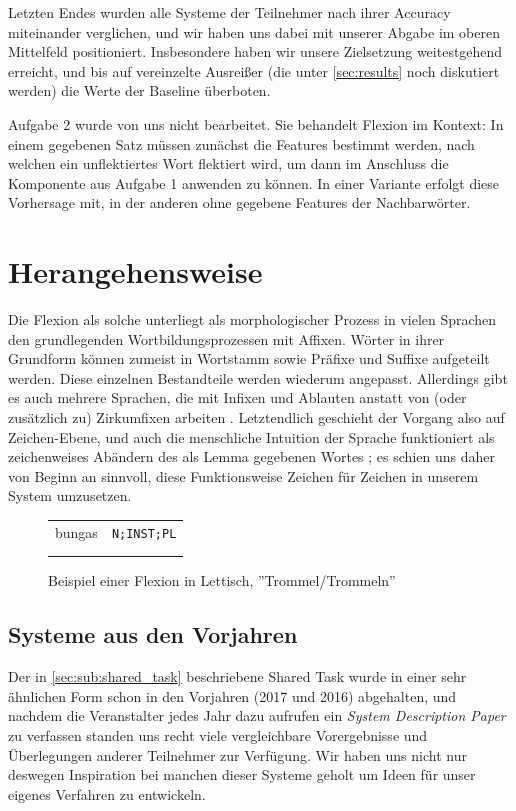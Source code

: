 \documentclass[11pt,a4paper]{article}
\begin{document}
Letzten Endes wurden alle Systeme der Teilnehmer nach ihrer Accuracy miteinander verglichen, und wir haben uns dabei mit unserer Abgabe im oberen Mittelfeld positioniert. Insbesondere haben wir unsere Zielsetzung weitestgehend erreicht, und bis auf vereinzelte Ausreißer (die unter \autoref{sec:results} noch diskutiert werden) die Werte der Baseline überboten.

Aufgabe 2 wurde von uns nicht bearbeitet. Sie behandelt Flexion im Kontext: In einem gegebenen Satz müssen zunächst die Features bestimmt werden, nach welchen ein unflektiertes Wort flektiert wird, um dann im Anschluss die Komponente aus Aufgabe 1 anwenden zu können. In einer Variante erfolgt diese Vorhersage mit, in der anderen ohne gegebene Features der Nachbarwörter.

\section{Herangehensweise}
\label{sec:approach}

Die Flexion als solche unterliegt als morphologischer Prozess in vielen Sprachen den grundlegenden Wortbildungsprozessen mit Affixen.
Wörter in ihrer Grundform können zumeist in Wortstamm sowie Präfixe und Suffixe aufgeteilt werden. Diese einzelnen Bestandteile werden wiederum angepasst.
Allerdings gibt es auch mehrere Sprachen, die mit Infixen und Ablauten anstatt von (oder zusätzlich zu) Zirkumfixen arbeiten \citep{inflection_seq}.
Letztendlich geschieht der Vorgang also auf Zeichen-Ebene, und auch die menschliche Intuition der Sprache funktioniert als zeichenweises Abändern des als Lemma gegebenen Wortes \citep{pinker:2015:words}; es schien uns daher von Beginn an sinnvoll, diese Funktionsweise Zeichen für Zeichen in unserem System umzusetzen.

\begin{figure}[htb]
\centering
\begin{tabular}{cc}
bungas & \texttt{N;INST;PL}\\  \addlinespace
\multicolumn{2}{c}{$\Downarrow$}\\ \addlinespace
\multicolumn{2}{c}{bungām}
\end{tabular}
\caption{Beispiel einer Flexion in Lettisch, ''Trommel/Trommeln''}
\label{fig:example-inflection}
\end{figure}

\subsection{Systeme aus den Vorjahren}
Der in \autoref{sec:sub:shared_task} beschriebene Shared Task wurde in einer sehr ähnlichen Form schon in den Vorjahren (2017 und 2016) abgehalten, und nachdem die Veranstalter jedes Jahr dazu aufrufen ein \textit{System Description Paper} zu verfassen standen uns recht viele vergleichbare Vorergebnisse und Überlegungen anderer Teilnehmer zur Verfügung. Wir haben uns nicht nur deswegen Inspiration bei manchen dieser Systeme geholt um Ideen für unser eigenes Verfahren zu entwickeln.
\end{document}

